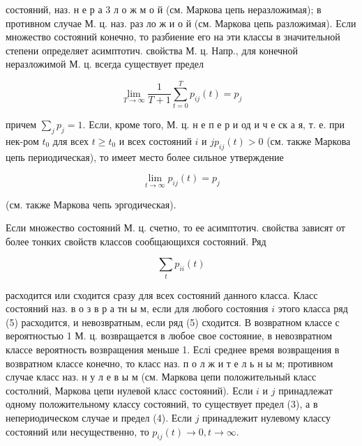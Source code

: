\documentclass[10pt]{article}
\begin{document}
состояний, наз. н е р а 3 л о ж м о й (см. Маркова цепь неразложимая); в противном случае М. ц. наз. раз ло ж и о й (см. Маркова цепь разложимая). Если множество состояний конечно, то разбиение его на эти классы в значительной степени определяет асимптотич. свойства М. ц. Напр., для конечной неразложимой М. ц. всегда существует предел



\[

\lim _{T \rightarrow \infty} \frac{1}{T+1} \sum_{t=0}^{T} p_{i j}(t)=p_{j}

\]



причем $\sum_{j} p_{j}=1$. Если, кроме того, М. ц. н е п е р и од и ч е ск а я, т. е. при нек-ром $t_{0}$ для всех $t \geqslant t_{0}$ и всех состояний $i$ и $j p_{i j}(t)>0$ (см. также Маркова цепь периодическая), то имеет место более сильное утверждение



\[

\lim _{t \rightarrow \infty} p_{i j}(t)=p_{j}

\]



(см. также Маркова чепь эргодическая).



Если множество состояний М. ц. счетно, то ее асимптотич. свойства зависят от более тонких свойств классов сообщающихся состояний. Ряд



\[

\sum_{t} p_{i i}(t)

\]



расходится или сходится сразу для всех состояний данного класса. Класс состояний наз. в о з в р а тн ы м, если для любого состояния $i$ этого класса ряд (5) расходится, и невозвратным, если ряд (5) сходится. В возвратном классе с вероятностью 1 М. ц. возвращается в любое свое состояние, в невозвратном классе вероятность возвращения меньше 1. Еслі среднее время возвращения в возвратном классе конечно, то класс наз. п о л ж и т е л ь н ы м; противном случае класс наз. н у л е в ы м (см. Маркова цепи положительный класс состолний, Маркова цепи нулевой класс состояний). Если $i$ и $j$ принадлежат одному положительному классу состояний, то существует предел (3), а в непериодическом случае и предел (4). Если $j$ принадлежит нулевому классу состояний или несущественно, то $p_{i j}(t) \rightarrow 0, t \rightarrow \infty$.
\end{document}
